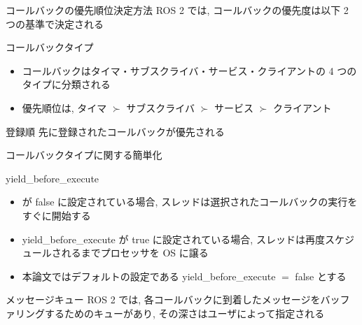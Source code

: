 \begin{frame}{コールバックの優先順位決定方法}
    ROS 2 では, コールバックの優先度は以下 2 つの基準で決定される

    \begin{block}{コールバックタイプ}
        \setlength{\linewidth}{0.98\columnwidth}
        \begin{itemize}
            \item コールバックはタイマ・サブスクライバ・サービス・クライアントの 4 つのタイプに分類される
            \item 優先順位は, タイマ $\succ$ サブスクライバ $\succ$ サービス $\succ$ クライアント 
        \end{itemize}
    \end{block}

    \begin{block}{登録順}
        先に登録されたコールバックが優先される
    \end{block}
\end{frame}

\begin{frame}{コールバックタイプに関する簡単化}
\end{frame}

\begin{frame}{yield\_before\_execute}
    \begin{itemize}
        \item {} が false に設定されている場合, スレッドは選択されたコールバックの実行をすぐに開始する
        \item yield\_before\_execute が true に設定されている場合, スレッドは再度スケジュールされるまでプロセッサを OS に譲る
        \item 本論文ではデフォルトの設定である yield\_before\_execute $=$ false とする
    \end{itemize}
\end{frame}

\begin{frame}{メッセージキュー}
    ROS 2 では, 各コールバックに到着したメッセージをバッファリングするためのキューがあり, その深さはユーザによって指定される
\end{frame}


